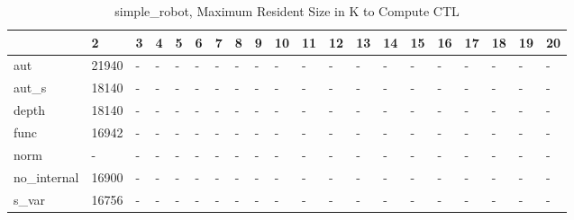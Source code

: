 \begin{table}
\caption{simple_robot, Maximum Resident Size in K to Compute CTL}
\label{simple_robot_CTL_size}
\begin{tabular}{llllllllllllllllllll}
\toprule
 & 2 & 3 & 4 & 5 & 6 & 7 & 8 & 9 & 10 & 11 & 12 & 13 & 14 & 15 & 16 & 17 & 18 & 19 & 20 \\
\midrule
aut & 21940 & - & - & - & - & - & - & - & - & - & - & - & - & - & - & - & - & - & - \\
aut_s & 18140 & - & - & - & - & - & - & - & - & - & - & - & - & - & - & - & - & - & - \\
depth & 18140 & - & - & - & - & - & - & - & - & - & - & - & - & - & - & - & - & - & - \\
func & 16942 & - & - & - & - & - & - & - & - & - & - & - & - & - & - & - & - & - & - \\
norm & - & - & - & - & - & - & - & - & - & - & - & - & - & - & - & - & - & - & - \\
no_internal & 16900 & - & - & - & - & - & - & - & - & - & - & - & - & - & - & - & - & - & - \\
s_var & 16756 & - & - & - & - & - & - & - & - & - & - & - & - & - & - & - & - & - & - \\
\bottomrule
\end{tabular}
\end{table}

